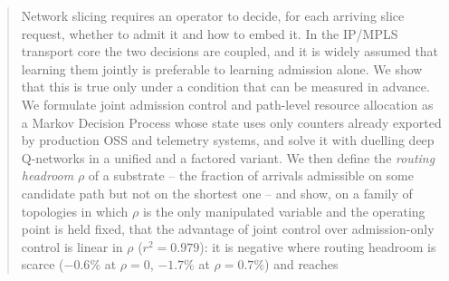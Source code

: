 \documentclass[10pt,journal,comsoc]{IEEEtran}
\begin{document}
\begin{abstract}
Network slicing requires an operator to decide, for each arriving slice
request, whether to admit it and how to embed it. In the IP/MPLS
transport core the two decisions are coupled, and it is widely assumed
that learning them jointly is preferable to learning admission alone. We
show that this is true only under a condition that can be measured in
advance. We formulate joint admission control and path-level resource
allocation as a Markov Decision Process whose state uses only counters
already exported by production OSS and telemetry systems, and solve it
with duelling deep Q-networks in a unified and a factored variant. We
then define the \emph{routing headroom} $\rho$ of a substrate -- the
fraction of arrivals admissible on some candidate path but not on the
shortest one -- and show, on a family of topologies in which $\rho$ is
the only manipulated variable and the operating point is held fixed,
that the advantage of joint control over admission-only control is
linear in $\rho$ ($r^2=0.979$): it is negative where routing headroom is
scarce ($-0.6\%$ at $\rho=0$, $-1.7\%$ at $\rho=0.7\%$) and reaches

\end{abstract}
\end{document}

